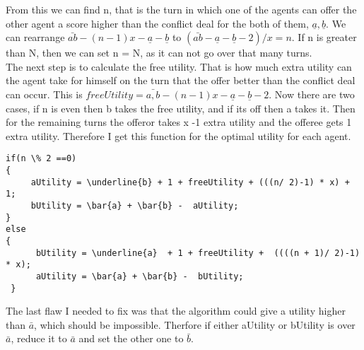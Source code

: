 From this we can find n, that is the turn in which one of the agents can offer the other agent a score higher than the conflict deal for the both of them, ${\underline{a},\underline{b}}$. We can rearrange $\bar{ab} - (n-1)x - \underline{a} - \underline{b}$ to $(\bar{ab} - \underline{a} - \underline{b} - 2) / x = n$. If n is greater than N, then we can set n = N, as it can not go over that many turns.
\\
The next step is to calculate the free utility. That is how much extra utility can the agent take for himself on the turn that the offer better than the conflict deal can occur. This is $freeUtility = \bar{a,b} - (n-1)x - \underline{a} - \underline{b} - 2$. Now there are two cases, if n is even then b takes the free utility, and if its off then a takes it. Then for the remaining turns the offeror takes x -1 extra utility and the offeree gets 1 extra utility. Therefore I get this function for the optimal utility for each agent.
\begin{lstlisting}
if(n \% 2 ==0)
{
     aUtility = \underline{b} + 1 + freeUtility + (((n/ 2)-1) * x) + 1;
     bUtility = \bar{a} + \bar{b} -  aUtility;
}
else
{
      bUtility = \underline{a}  + 1 + freeUtility +  ((((n + 1)/ 2)-1) * x);
      aUtility = \bar{a} + \bar{b} -  bUtility;
 }
\end{lstlisting}
The last flaw I needed to fix was that the algorithm could give a utility higher than $\bar{a}$, which should be impossible. Therfore if either aUtility or bUtility is over $\bar{a}$, reduce it to $\bar{a}$ and set the other one to $\bar{b}$. 





